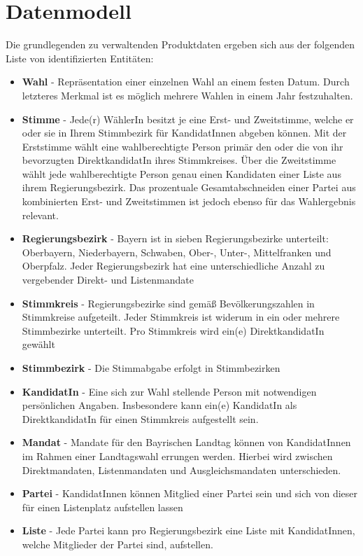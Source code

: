 \documentclass[a4paper,12pt]{article}
\begin{document}
\section{Datenmodell}
Die grundlegenden zu verwaltenden Produktdaten ergeben sich aus der folgenden Liste von
identifizierten Entitäten:
\begin{itemize}
  \item \textbf{Wahl} - Repräsentation einer einzelnen Wahl an einem festen Datum. 
        Durch letzteres Merkmal ist es möglich mehrere Wahlen in einem Jahr festzuhalten.
  \item \textbf{Stimme} - Jede(r) WählerIn besitzt je eine Erst- und Zweitstimme, welche er oder sie in Ihrem
        Stimmbezirk für KandidatInnen abgeben können. Mit der Erststimme wählt eine wahlberechtigte Person
        primär den oder die von ihr bevorzugten DirektkandidatIn ihres Stimmkreises. Über die Zweitstimme wählt 
        jede wahlberechtigte Person genau einen Kandidaten einer Liste aus ihrem Regierungsbezirk. Das prozentuale
        Gesamtabschneiden einer Partei aus kombinierten Erst- und Zweitstimmen ist jedoch ebenso für das 
        Wahlergebnis relevant.
  \item \textbf{Regierungsbezirk} - Bayern ist in sieben Regierungsbezirke unterteilt: Oberbayern,
        Niederbayern, Schwaben, Ober-, Unter-, Mittelfranken und Oberpfalz. Jeder Regierungsbezirk
        hat eine unterschiedliche Anzahl zu vergebender Direkt- und Listenmandate
  \item \textbf{Stimmkreis} - Regierungsbezirke sind gemäß Bevölkerungszahlen in Stimmkreise aufgeteilt.
        Jeder Stimmkreis ist widerum in ein oder mehrere Stimmbezirke unterteilt. Pro Stimmkreis wird ein(e)
        DirektkandidatIn gewählt
  \item \textbf{Stimmbezirk} - Die Stimmabgabe erfolgt in Stimmbezirken
  \item \textbf{KandidatIn} - Eine sich zur Wahl stellende Person mit notwendigen persönlichen Angaben. 
        Insbesondere kann ein(e) KandidatIn als DirektkandidatIn für einen Stimmkreis aufgestellt sein.
  \item \textbf{Mandat} - Mandate für den Bayrischen Landtag können von KandidatInnen im Rahmen einer Landtagswahl
        errungen werden. Hierbei wird zwischen Direktmandaten, Listenmandaten und Ausgleichsmandaten unterschieden.
  \item \textbf{Partei} - KandidatInnen können Mitglied einer Partei sein und sich von dieser für einen Listenplatz
        aufstellen lassen
  \item \textbf{Liste} - Jede Partei kann pro Regierungsbezirk eine Liste mit KandidatInnen, welche Mitglieder der 
        Partei sind, aufstellen.
\end{itemize}
\end{document}
